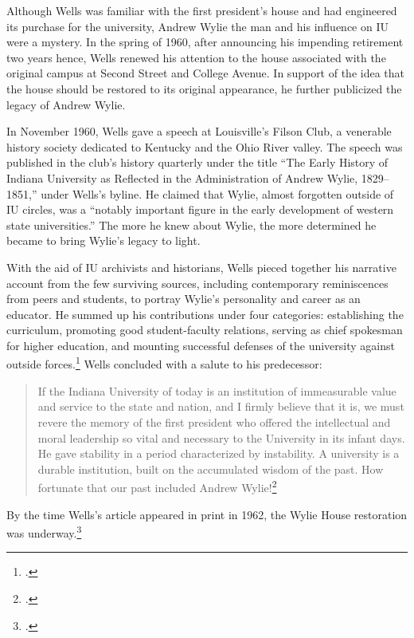 \documentclass[
  american,
  letterpaper,
]{scrreprt}
\begin{document}
Although Wells was familiar with the first president's house and had
engineered its purchase for the university, Andrew Wylie the man and his
influence on IU were a mystery. In the spring of 1960, after announcing
his impending retirement two years hence, Wells renewed his attention to
the house associated with the original campus at Second Street and
College Avenue. In support of the idea that the house should be restored
to its original appearance, he further publicized the legacy of Andrew
Wylie.

In November 1960, Wells gave a speech at Louisville's Filson Club, a
venerable history society dedicated to Kentucky and the Ohio River
valley. The speech was published in the club's history quarterly under
the title ``The Early History of Indiana University as Reflected in the
Administration of Andrew Wylie, 1829--1851,'' under Wells's byline. He
claimed that Wylie, almost forgotten outside of IU circles, was a
``notably important figure in the early development of western state
universities.'' The more he knew about Wylie, the more determined he
became to bring Wylie's legacy to light.

With the aid of IU archivists and historians, Wells pieced together his
narrative account from the few surviving sources, including contemporary
reminiscences from peers and students, to portray Wylie's personality
and career as an educator. He summed up his contributions under four
categories: establishing the curriculum, promoting good student-faculty
relations, serving as chief spokesman for higher education, and mounting
successful defenses of the university against outside forces.\footnote{.} Wells concluded with a salute to
his predecessor:

\begin{quote}
If the Indiana University of today is an institution of immeasurable
value and service to the state and nation, and I firmly believe that it
is, we must revere the memory of the first president who offered the
intellectual and moral leadership so vital and necessary to the
University in its infant days. He gave stability in a period
characterized by instability. A university is a durable institution,
built on the accumulated wisdom of the past. How fortunate that our past
included Andrew Wylie!\footnote{.}
\end{quote}

By the time Wells's article appeared in print in 1962, the Wylie House
restoration was underway.\footnote{.}
\end{document}
